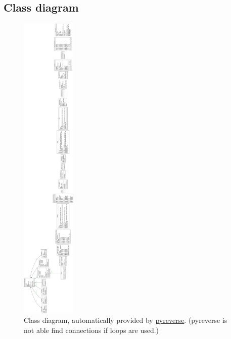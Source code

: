  \subsection*{Class diagram}
  \begin{figure}[H]
   \includegraphics[width=0.23\textwidth]{../Images/classdiagram.png}
   \centering
   \caption{Class diagram, automatically provided by \href{https://pypi.org/project/pyreverse/}{pyreverse}. (pyreverse is not able find connections if loops are 
   used.)}
   \label{fig:tree}
  \end{figure}\noindent

